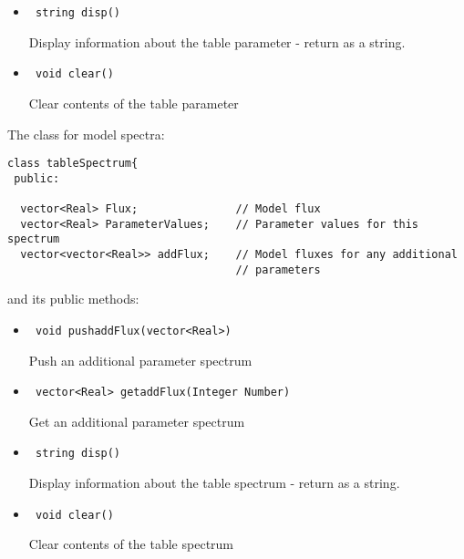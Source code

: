 \documentclass[11pt]{book}
\begin{document}
\begin{itemize}

\item    \begin{verbatim} string disp() \end{verbatim}

           Display information about the table parameter - return as a string.

\item    \begin{verbatim} void clear() \end{verbatim}

           Clear contents of the table parameter

\end{itemize}

The class for model spectra:

\begin{verbatim}
class tableSpectrum{
 public:

  vector<Real> Flux;               // Model flux
  vector<Real> ParameterValues;    // Parameter values for this spectrum
  vector<vector<Real>> addFlux;    // Model fluxes for any additional
                                   // parameters
\end{verbatim}

and its public methods:

\begin{itemize}

\item    \begin{verbatim} void pushaddFlux(vector<Real>) \end{verbatim}
            
            Push an additional parameter spectrum

\item    \begin{verbatim} vector<Real> getaddFlux(Integer Number) \end{verbatim}
            
            Get an additional parameter spectrum

\item    \begin{verbatim} string disp() \end{verbatim}

            Display information about the table spectrum - return as a string.

\item    \begin{verbatim} void clear() \end{verbatim}

            Clear contents of the table spectrum

\end{itemize}
\end{document}
